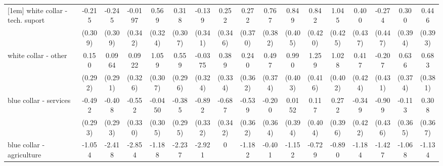 {\begin{tabular}{l*{16}{c}}
[1em]
white collar - tech. suport&      -0.215         &      -0.245         &     -0.0197         &       0.569         &       0.318         &      -0.139         &       0.252         &       0.272         &       0.767\sym{*}  &       0.849\sym{*}  &       0.842\sym{*}  &       1.045\sym{*}  &       0.400         &      -0.274         &       0.300         &       0.446         \\
                    &     (0.309)         &     (0.309)         &     (0.342)         &     (0.324)         &     (0.307)         &     (0.341)         &     (0.346)         &     (0.370)         &     (0.382)         &     (0.405)         &     (0.420)         &     (0.425)         &     (0.437)         &     (0.447)         &     (0.394)         &     (0.393)         \\
[1em]
white collar - other&       0.150         &      0.0964         &      0.0922         &       1.059\sym{***}&       0.559         &     -0.0375         &       0.389         &       0.240         &       0.497         &       0.990\sym{*}  &       1.259\sym{**} &       1.028\sym{*}  &       0.417         &      -0.207         &       0.636         &       0.683         \\
                    &     (0.292)         &     (0.291)         &     (0.326)         &     (0.307)         &     (0.296)         &     (0.324)         &     (0.334)         &     (0.362)         &     (0.374)         &     (0.403)         &     (0.416)         &     (0.402)         &     (0.424)         &     (0.431)         &     (0.374)         &     (0.381)         \\
[1em]
blue collar - services&      -0.492         &      -0.408         &      -0.552         &     -0.0450         &      -0.385         &      -0.892\sym{**} &      -0.687\sym{*}  &      -0.539         &      -0.200         &      0.0152         &       0.117         &       0.272         &      -0.349         &      -0.909\sym{*}  &      -0.113         &       0.308         \\
                    &     (0.293)         &     (0.293)         &     (0.330)         &     (0.305)         &     (0.295)         &     (0.332)         &     (0.342)         &     (0.362)         &     (0.364)         &     (0.394)         &     (0.404)         &     (0.396)         &     (0.422)         &     (0.436)         &     (0.365)         &     (0.367)         \\
[1em]
blue collar - agriculture&      -1.054         &      -2.418\sym{**} &      -2.854\sym{*}  &      -1.188         &      -2.237\sym{*}  &      -2.921\sym{*}  &           0         &      -1.182         &      -0.401         &      -1.152         &      -0.729         &      -0.890         &      -1.184         &      -1.427         &      -1.068         &      -1.134         \\

\end{tabular}}
